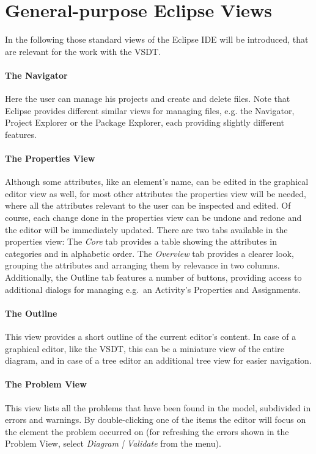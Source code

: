 \section{General-purpose Eclipse Views}
\label{sec:user_perspective_general}

In the following those standard views of the Eclipse IDE will be introduced, that are relevant for the work with the VSDT.

\paragraph*{The Navigator}
Here the user can manage his projects and create and delete files.  Note that Eclipse provides different similar views for managing files, e.g. the Navigator, Project Explorer or the Package Explorer, each providing slightly different features.

\paragraph*{The Properties View}
Although some attributes, like an element's name, can be edited in the graphical editor view as well, for most other attributes the properties view will be needed, where all the attributes relevant to the user can be inspected and edited. Of course, each change done in the properties view can be undone and redone and the editor will be immediately updated. There are two tabs available in the properties view: The \emph{Core} tab provides a table showing the attributes in categories and in alphabetic order. The \emph{Overview} tab provides a clearer look, grouping the attributes and arranging them by relevance in two columns. Additionally, the Outline tab features a number of buttons, providing access to additional dialogs for managing e.g.\ an Activity's Properties and Assignments.

\paragraph*{The Outline}
This view provides a short outline of the current editor's content. In case of a graphical editor, like the VSDT, this can be a miniature view of the entire diagram, and in case of a tree editor an additional tree view for easier navigation. 

\paragraph*{The Problem View}
This view lists all the problems that have been found in the model, subdivided in errors and warnings. By double-clicking one of the items the editor will focus on the element the problem occurred on (for refreshing the errors shown in the Problem View, select \emph{Diagram | Validate} from the menu).

